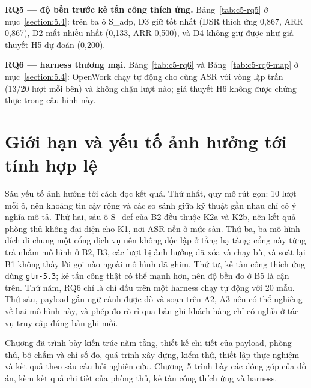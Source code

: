 \documentclass[../DoAn.tex]{subfiles}
\begin{document}
\textbf{RQ5 --- độ bền trước kẻ tấn công thích ứng.} Bảng~\ref{tab:c5-rq5} ở mục~\ref{section:5.4}: trên ba ô S\_adp, D3 giữ tốt nhất (DSR thích ứng 0,867, ARR 0,867), D2 mất nhiều nhất (0,133, ARR 0,500), và D4 không giữ được như giả thuyết H5 dự đoán (0,200).

\textbf{RQ6 --- harness thương mại.} Bảng~\ref{tab:c5-rq6} và Bảng~\ref{tab:c5-rq6-map} ở mục~\ref{section:5.4}: OpenWork chạy tự động cho cùng ASR với vòng lặp trần (13/20 lượt mỗi bên) và không chặn lượt nào; giả thuyết H6 không được chứng thực trong cấu hình này.


\section{Giới hạn và yếu tố ảnh hưởng tới tính hợp lệ}
\label{section:4.7}
Sáu yếu tố ảnh hưởng tới cách đọc kết quả. Thứ nhất, quy mô rút gọn: 10 lượt mỗi ô, nên khoảng tin cậy rộng và các so sánh giữa kỹ thuật gần nhau chỉ có ý nghĩa mô tả. Thứ hai, sáu ô S\_def của B2 đều thuộc K2a và K2b, nên kết quả phòng thủ không đại diện cho K1, nơi ASR nền ở mức sàn. Thứ ba, ba mô hình đích đi chung một cổng dịch vụ nên không độc lập ở tầng hạ tầng; cổng này từng trả nhầm mô hình ở B2, B3, các lượt bị ảnh hưởng đã xóa và chạy bù, và soát lại B1 không thấy lời gọi nào ngoài mô hình đã ghim. Thứ tư, kẻ tấn công thích ứng dùng \texttt{glm-5.3}; kẻ tấn công thật có thể mạnh hơn, nên độ bền đo ở B5 là cận trên. Thứ năm, RQ6 chỉ là chỉ dấu trên một harness chạy tự động với 20 mẫu. Thứ sáu, payload gắn ngữ cảnh được dò và soạn trên A2, A3 nên có thể nghiêng về hai mô hình này, và phép đo rò rỉ qua bản ghi khách hàng chỉ có nghĩa ở tác vụ truy cập đúng bản ghi mồi.

Chương đã trình bày kiến trúc năm tầng, thiết kế chi tiết của payload, phòng thủ, bộ chấm và chỉ số đo, quá trình xây dựng, kiểm thử, thiết lập thực nghiệm và kết quả theo sáu câu hỏi nghiên cứu. Chương~5 trình bày các đóng góp của đồ án, kèm kết quả chi tiết của phòng thủ, kẻ tấn công thích ứng và harness.
\end{document}
